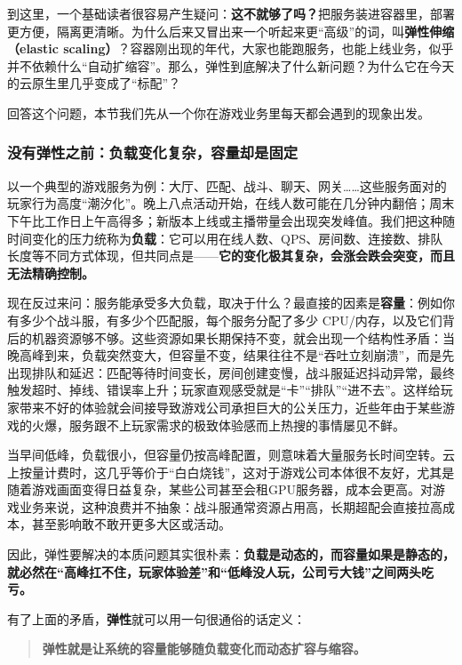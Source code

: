 到这里，一个基础读者很容易产生疑问：\textbf{这不就够了吗？}把服务装进容器里，部署更方便，隔离更清晰。为什么后来又冒出来一个听起来更“高级”的词，叫\textbf{弹性伸缩（elastic scaling）}？容器刚出现的年代，大家也能跑服务，也能上线业务，似乎并不依赖什么“自动扩缩容”。那么，弹性到底解决了什么新问题？为什么它在今天的云原生里几乎变成了“标配”？

回答这个问题，本节我们先从一个你在游戏业务里每天都会遇到的现象出发。

\subsubsection{没有弹性之前：负载变化复杂，容量却是固定}

以一个典型的游戏服务为例：大厅、匹配、战斗、聊天、网关……这些服务面对的玩家行为高度“潮汐化”。晚上八点活动开始，在线人数可能在几分钟内翻倍；周末下午比工作日上午高得多；新版本上线或主播带量会出现突发峰值。我们把这种随时间变化的压力统称为\textbf{负载}：它可以用在线人数、QPS、房间数、连接数、排队长度等不同方式体现，但共同点是——\textbf{它的变化极其复杂，会涨会跌会突变，而且无法精确控制。}

现在反过来问：服务能承受多大负载，取决于什么？最直接的因素是\textbf{容量}：例如你有多少个战斗服，有多少个匹配服，每个服务分配了多少 CPU/内存，以及它们背后的机器资源够不够。这些资源如果长期保持不变，就会出现一个结构性矛盾：当晚高峰到来，负载突然变大，但容量不变，结果往往不是“吞吐立刻崩溃”，而是先出现排队和延迟：匹配等待时间变长，房间创建变慢，战斗服延迟抖动异常，最终触发超时、掉线、错误率上升；玩家直观感受就是“卡”“排队”“进不去”。这样给玩家带来不好的体验就会间接导致游戏公司承担巨大的公关压力，近些年由于某些游戏的火爆，服务跟不上玩家需求的极致体验感而上热搜的事情屡见不鲜。

当早间低峰，负载很小，但容量仍按高峰配置，则意味着大量服务长时间空转。云上按量计费时，这几乎等价于“白白烧钱”，这对于游戏公司本体很不友好，尤其是随着游戏画面变得日益复杂，某些公司甚至会租GPU服务器，成本会更高。对游戏业务来说，这种浪费并不抽象：战斗服通常资源占用高，长期超配会直接拉高成本，甚至影响敢不敢开更多大区或活动。

因此，弹性要解决的本质问题其实很朴素：\textbf{负载是动态的，而容量如果是静态的，就必然在“高峰扛不住，玩家体验差”和“低峰没人玩，公司亏大钱”之间两头吃亏。}

有了上面的矛盾，\textbf{弹性}就可以用一句很通俗的话定义：\begin{quote}
\textbf{弹性就是让系统的容量能够随负载变化而动态扩容与缩容。}
\end{quote}

